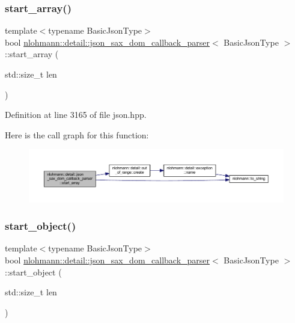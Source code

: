 \subsubsection{\texorpdfstring{start\_array()}{start\_array()}}
{\footnotesize\ttfamily template$<$typename Basic\+Json\+Type$>$ \\
bool \mbox{\hyperlink{classnlohmann_1_1detail_1_1json__sax__dom__callback__parser}{nlohmann\+::detail\+::json\+\_\+sax\+\_\+dom\+\_\+callback\+\_\+parser}}$<$ Basic\+Json\+Type $>$\+::start\+\_\+array (\begin{DoxyParamCaption}\item[{std\+::size\+\_\+t}]{len }\end{DoxyParamCaption})\hspace{0.3cm}{\ttfamily [inline]}}



Definition at line 3165 of file json.\+hpp.

Here is the call graph for this function\+:
\nopagebreak
\begin{figure}[H]
\begin{center}
\leavevmode
\includegraphics[width=350pt]{classnlohmann_1_1detail_1_1json__sax__dom__callback__parser_a5255b98ba8282e3625968f91cff9d3d0_cgraph}
\end{center}
\end{figure}
\mbox{\label{classnlohmann_1_1detail_1_1json__sax__dom__callback__parser_a040e60243cc7c18a6078c6b83cdb4a81}} 
\subsubsection{\texorpdfstring{start\_object()}{start\_object()}}
{\footnotesize\ttfamily template$<$typename Basic\+Json\+Type$>$ \\
bool \mbox{\hyperlink{classnlohmann_1_1detail_1_1json__sax__dom__callback__parser}{nlohmann\+::detail\+::json\+\_\+sax\+\_\+dom\+\_\+callback\+\_\+parser}}$<$ Basic\+Json\+Type $>$\+::start\+\_\+object (\begin{DoxyParamCaption}\item[{std\+::size\+\_\+t}]{len }\end{DoxyParamCaption})\hspace{0.3cm}{\ttfamily [inline]}}




